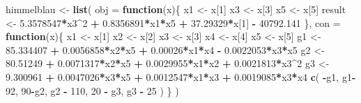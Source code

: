 \documentclass[]{ctexbook}
\newenvironment{Shaded}{\begin{snugshade}}{\end{snugshade}}
\newcommand{\KeywordTok}[1]{\textcolor[rgb]{0.13,0.29,0.53}{\textbf{#1}}}
\newcommand{\DataTypeTok}[1]{\textcolor[rgb]{0.13,0.29,0.53}{#1}}
\newcommand{\DecValTok}[1]{\textcolor[rgb]{0.00,0.00,0.81}{#1}}
\newcommand{\FloatTok}[1]{\textcolor[rgb]{0.00,0.00,0.81}{#1}}
\newcommand{\StringTok}[1]{\textcolor[rgb]{0.31,0.60,0.02}{#1}}
\newcommand{\ControlFlowTok}[1]{\textcolor[rgb]{0.13,0.29,0.53}{\textbf{#1}}}
\newcommand{\OperatorTok}[1]{\textcolor[rgb]{0.81,0.36,0.00}{\textbf{#1}}}
\newcommand{\NormalTok}[1]{#1}
\begin{document}
\begin{Shaded}
\begin{Highlighting}[]
\NormalTok{himmelblau <-}\StringTok{ }\KeywordTok{list}\NormalTok{(}
  \DataTypeTok{obj =} \ControlFlowTok{function}\NormalTok{(x)\{}
\NormalTok{    x1 <-}\StringTok{ }\NormalTok{x[}\DecValTok{1}\NormalTok{]}
\NormalTok{    x3 <-}\StringTok{ }\NormalTok{x[}\DecValTok{3}\NormalTok{]}
\NormalTok{    x5 <-}\StringTok{ }\NormalTok{x[}\DecValTok{5}\NormalTok{]}
\NormalTok{    result <-}\StringTok{ }\FloatTok{5.3578547}\OperatorTok{*}\NormalTok{x3}\OperatorTok{^}\DecValTok{2} \OperatorTok{+}\StringTok{ }
\StringTok{      }\FloatTok{0.8356891}\OperatorTok{*}\NormalTok{x1}\OperatorTok{*}\NormalTok{x5 }\OperatorTok{+}\StringTok{ }
\StringTok{      }\FloatTok{37.29329}\OperatorTok{*}\NormalTok{x[}\DecValTok{1}\NormalTok{] }\OperatorTok{-}\StringTok{ }
\StringTok{      }\FloatTok{40792.141}
\NormalTok{  \},}
  \DataTypeTok{con =} \ControlFlowTok{function}\NormalTok{(x)\{}
\NormalTok{    x1 <-}\StringTok{ }\NormalTok{x[}\DecValTok{1}\NormalTok{]}
\NormalTok{    x2 <-}\StringTok{ }\NormalTok{x[}\DecValTok{2}\NormalTok{]}
\NormalTok{    x3 <-}\StringTok{ }\NormalTok{x[}\DecValTok{3}\NormalTok{]}
\NormalTok{    x4 <-}\StringTok{ }\NormalTok{x[}\DecValTok{4}\NormalTok{]}
\NormalTok{    x5 <-}\StringTok{ }\NormalTok{x[}\DecValTok{5}\NormalTok{]}
\NormalTok{    g1 <-}\StringTok{ }\FloatTok{85.334407} \OperatorTok{+}\StringTok{ }\FloatTok{0.0056858}\OperatorTok{*}\NormalTok{x2}\OperatorTok{*}\NormalTok{x5 }\OperatorTok{+}\StringTok{ }
\StringTok{      }\FloatTok{0.00026}\OperatorTok{*}\NormalTok{x1}\OperatorTok{*}\NormalTok{x4 }\OperatorTok{-}\StringTok{ }\FloatTok{0.0022053}\OperatorTok{*}\NormalTok{x3}\OperatorTok{*}\NormalTok{x5}
\NormalTok{    g2 <-}\StringTok{ }\FloatTok{80.51249} \OperatorTok{+}\StringTok{ }\FloatTok{0.0071317}\OperatorTok{*}\NormalTok{x2}\OperatorTok{*}\NormalTok{x5 }\OperatorTok{+}\StringTok{ }
\StringTok{      }\FloatTok{0.0029955}\OperatorTok{*}\NormalTok{x1}\OperatorTok{*}\NormalTok{x2 }\OperatorTok{+}\StringTok{ }\FloatTok{0.0021813}\OperatorTok{*}\NormalTok{x3}\OperatorTok{^}\DecValTok{2}
\NormalTok{    g3 <-}\StringTok{ }\FloatTok{9.300961} \OperatorTok{+}\StringTok{ }\FloatTok{0.0047026}\OperatorTok{*}\NormalTok{x3}\OperatorTok{*}\NormalTok{x5 }\OperatorTok{+}\StringTok{ }
\StringTok{      }\FloatTok{0.0012547}\OperatorTok{*}\NormalTok{x1}\OperatorTok{*}\NormalTok{x3 }\OperatorTok{+}\StringTok{ }\FloatTok{0.0019085}\OperatorTok{*}\NormalTok{x3}\OperatorTok{*}\NormalTok{x4}
    \KeywordTok{c}\NormalTok{(}
      \OperatorTok{-}\NormalTok{g1,}
\NormalTok{      g1}\OperatorTok{-}\DecValTok{92}\NormalTok{,}
      \DecValTok{90}\OperatorTok{-}\NormalTok{g2,}
\NormalTok{      g2 }\OperatorTok{-}\StringTok{ }\DecValTok{110}\NormalTok{,}
      \DecValTok{20} \OperatorTok{-}\StringTok{ }\NormalTok{g3,}
\NormalTok{      g3 }\OperatorTok{-}\StringTok{ }\DecValTok{25}
\NormalTok{    )}
\NormalTok{  \}}
\NormalTok{)}
\end{Highlighting}
\end{Shaded}
\end{document}
